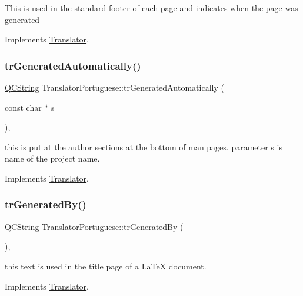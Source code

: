 This is used in the standard footer of each page and indicates when the page was generated 

Implements \mbox{\hyperlink{class_translator}{Translator}}.

\mbox{\label{class_translator_portuguese_a137ac3f645931de02e3640d6add622d8}} 
\subsubsection{\texorpdfstring{trGeneratedAutomatically()}{trGeneratedAutomatically()}}
{\footnotesize\ttfamily \mbox{\hyperlink{class_q_c_string}{Q\+C\+String}} Translator\+Portuguese\+::tr\+Generated\+Automatically (\begin{DoxyParamCaption}\item[{const char $\ast$}]{s }\end{DoxyParamCaption})\hspace{0.3cm}{\ttfamily [inline]}, {\ttfamily [virtual]}}

this is put at the author sections at the bottom of man pages. parameter s is name of the project name. 

Implements \mbox{\hyperlink{class_translator}{Translator}}.

\mbox{\label{class_translator_portuguese_a161fe78f84318411181b2cbe7d8f4f67}} 
\subsubsection{\texorpdfstring{trGeneratedBy()}{trGeneratedBy()}}
{\footnotesize\ttfamily \mbox{\hyperlink{class_q_c_string}{Q\+C\+String}} Translator\+Portuguese\+::tr\+Generated\+By (\begin{DoxyParamCaption}{ }\end{DoxyParamCaption})\hspace{0.3cm}{\ttfamily [inline]}, {\ttfamily [virtual]}}

this text is used in the title page of a La\+TeX document. 

Implements \mbox{\hyperlink{class_translator}{Translator}}.


